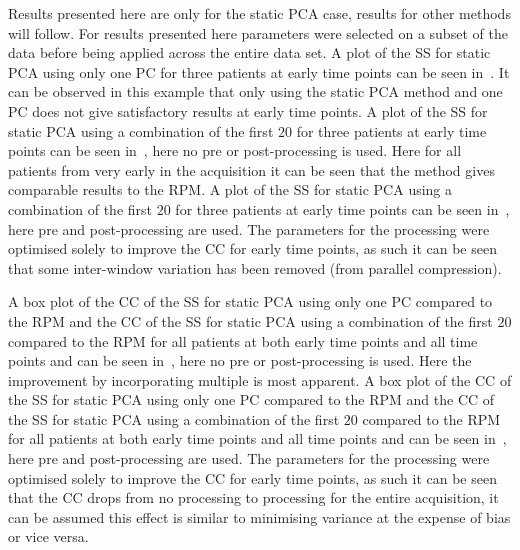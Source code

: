             Results presented here are only for the static \gls{PCA} case, results for other methods will follow. For results presented here parameters were selected on a subset of the data before being applied across the entire data set. A plot of the \gls{SS} for static \gls{PCA} using only one \gls{PC} for three patients at early time points can be seen in~. It can be observed in this example that only using the static \gls{PCA} method and one \gls{PC} does not give satisfactory results at early time points. A plot of the \gls{SS} for static \gls{PCA} using a combination of the first $20$  for three patients at early time points can be seen in~, here no pre or post-processing is used. Here for all patients from very early in the acquisition it can be seen that the method gives comparable results to the \gls{RPM}. A plot of the \gls{SS} for static \gls{PCA} using a combination of the first $20$  for three patients at early time points can be seen in~, here pre and post-processing are used. The parameters for the processing were optimised solely to improve the \gls{CC} for early time points, as such it can be seen that some inter-window variation has been removed (from parallel compression).
            
            A box plot of the \gls{CC} of the \gls{SS} for static \gls{PCA} using only one \gls{PC} compared to the \gls{RPM} and the \gls{CC} of the \gls{SS} for static \gls{PCA} using a combination of the first $20$  compared to the \gls{RPM} for all patients at both early time points and all time points and  can be seen in~, here no pre or post-processing is used. Here the improvement by incorporating multiple  is most apparent. A box plot of the \gls{CC} of the \gls{SS} for static \gls{PCA} using only one \gls{PC} compared to the \gls{RPM} and the \gls{CC} of the \gls{SS} for static \gls{PCA} using a combination of the first $20$  compared to the \gls{RPM} for all patients at both early time points and all time points and  can be seen in~, here pre and post-processing are used. The parameters for the processing were optimised solely to improve the \gls{CC} for early time points, as such it can be seen that the \gls{CC} drops from no processing to processing for the entire acquisition, it can be assumed this effect is similar to minimising variance at the expense of bias or vice versa.
            
